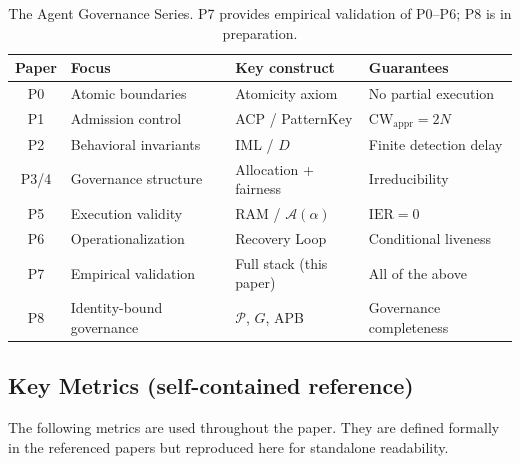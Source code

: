 \documentclass[11pt]{article}
\newcommand{\Dhat}{\widehat{D}}
\newcommand{\CW}{\mathrm{CW}}
\newcommand{\IER}{\mathrm{IER}}
\begin{document}
\begin{table}[h]
\centering
\small
\begin{tabular}{@{}clll@{}}
\toprule
Paper & Focus & Key construct & Guarantees \\
\midrule
P0 & Atomic boundaries      & Atomicity axiom       & No partial execution \\
P1 & Admission control      & ACP / PatternKey      & $\CW_{\mathrm{appr}} = 2N$ \\
P2 & Behavioral invariants  & IML / $\Dhat$         & Finite detection delay \\
P3/4 & Governance structure & Allocation + fairness & Irreducibility \\
P5 & Execution validity     & RAM / $\mathcal{A}(\alpha)$ & $\IER = 0$ \\
P6 & Operationalization     & Recovery Loop         & Conditional liveness \\
P7 & Empirical validation   & Full stack (this paper) & All of the above \\
P8 & Identity-bound governance & $\mathcal{P}$, $G$, APB & Governance completeness \\
\bottomrule
\end{tabular}
\caption{The Agent Governance Series. P7 provides empirical validation of P0--P6; P8 is in preparation.}
\label{tab:series}
\end{table}

\subsection*{Key Metrics (self-contained reference)}

The following metrics are used throughout the paper.
They are defined formally in the referenced papers but reproduced here for
standalone readability.
\end{document}
